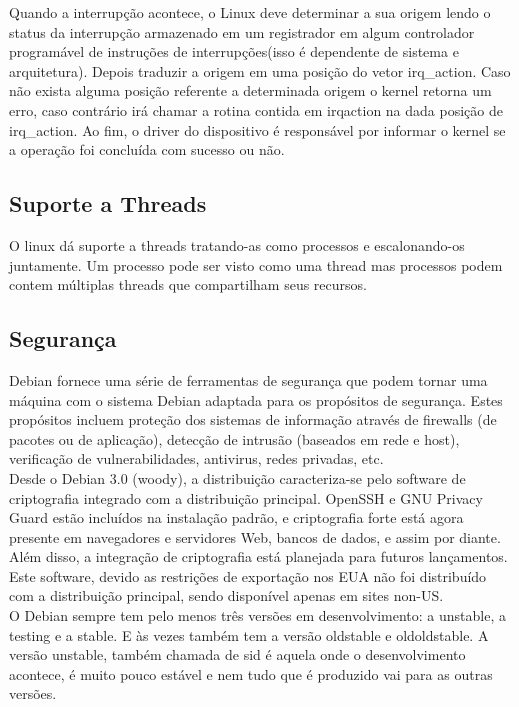 \documentclass[conference]{IEEEtran}
\begin{document}
Quando a interrupção acontece, o Linux deve determinar a sua origem lendo o status da interrupção armazenado em um registrador em algum controlador programável de instruções de interrupções(isso é dependente de sistema e arquitetura). Depois traduzir a origem em uma posição do vetor irq\_action. Caso não exista alguma posição referente a determinada origem o kernel retorna um erro, caso contrário irá chamar a rotina contida em irqaction na dada posição de irq\_action. Ao fim, o driver do dispositivo é responsável por informar o kernel se a operação foi concluída com sucesso ou não\cite{InterruptsLinux}.
\subsection{Suporte a Threads}\label{sec:LinuxThreads}
O linux dá suporte a threads tratando-as como processos e escalonando-os juntamente. Um processo pode ser visto como uma thread mas
processos podem contem múltiplas threads que compartilham seus recursos\cite{LinuxSchedulerIBM}.
\subsection{Segurança}\label{sec:LinuxSec}
Debian fornece uma série de ferramentas de segurança que podem tornar uma máquina com o sistema Debian adaptada para os propósitos de segurança. Estes propósitos incluem proteção dos sistemas de informação através de firewalls (de pacotes ou de aplicação), detecção de intrusão (baseados em rede e host), verificação de vulnerabilidades, antivirus, redes privadas, etc\cite{SegLinux}.\\

Desde o Debian 3.0 (woody), a distribuição caracteriza-se pelo software de criptografia integrado com a distribuição principal. OpenSSH e GNU Privacy Guard estão incluídos na instalação padrão, e criptografia forte está agora presente em navegadores e servidores Web, bancos de dados, e assim por diante. Além disso, a integração de criptografia está planejada para futuros lançamentos. Este software, devido as restrições de exportação nos EUA não foi distribuído com a distribuição principal, sendo disponível apenas em sites non-US.\cite{SegLinux}\\

O Debian sempre tem pelo menos três versões em desenvolvimento: a unstable, a testing e a stable. E às vezes também tem a versão oldstable e oldoldstable. A versão unstable, também chamada de sid é aquela onde o desenvolvimento acontece, é muito pouco estável e nem tudo que é produzido vai para as outras versões.\\
\end{document}
